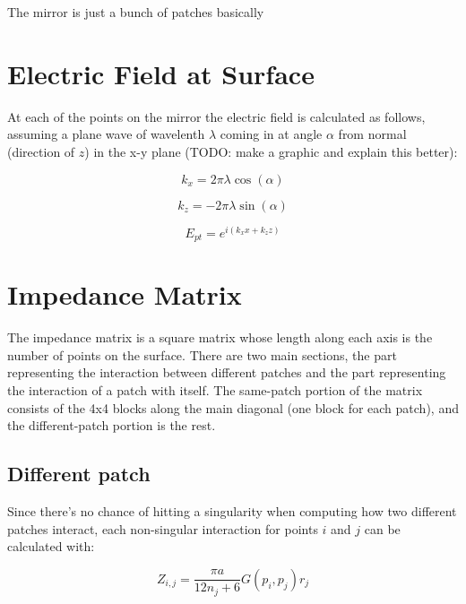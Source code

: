 \documentclass[etd,oneside,senior]{BYUPhys}
\begin{document}
The mirror is just a bunch of patches basically



\section{Electric Field at Surface}\label{chap:efield}

At each of the points on the mirror the electric field is calculated as follows, assuming a plane wave of wavelenth $\lambda$ coming in at angle $\alpha$ from normal (direction of $z$) in the x-y plane (TODO: make a graphic and explain this better):

\begin{equation}
  k_{x}=2\pi\lambda\cos\left(\alpha\right)
\end{equation}

\begin{equation}
  k_{z}=-2\pi\lambda\sin\left(\alpha\right)
\end{equation}

\begin{equation}
  E_{pt}=e^{i\left(k_{x}x+k_{z}z\right)}
\end{equation}



\section{Impedance Matrix} \label{sec:impedance}

The impedance matrix is a square matrix whose length along each axis is the number of points on the surface. There are two main sections, the part representing the interaction between different patches and the part representing the interaction of a patch with itself. The same-patch portion of the matrix consists of the 4x4 blocks along the main diagonal (one block for each patch), and the different-patch portion is the rest.

\subsection{Different patch} \label{sec:different_patch}

Since there's no chance of hitting a singularity when computing how two different patches interact, each non-singular interaction for points $i$ and $j$ can be calculated with:

\begin{equation}
  Z_{i,j}=\frac{\pi a}{12n_{j}+6}G\left(p_{i},p_{j}\right)r_{j}
\end{equation}
\end{document}
